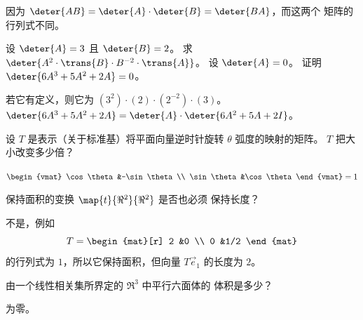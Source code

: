 \begin{exercises}
   \begin{answer}  %
     因为 $\deter{AB}=\deter{A}\cdot\deter{B}=\deter{BA}$，而这两个
     矩阵的行列式不同。
   \end{answer}
  \item 
   \begin{exparts}
     \partsitem 设 \( \deter{A}=3 \) 且 \( \deter{B}=2 \)。
        求 \( \deter{A^2\cdot \trans{B}\cdot B^{-2}\cdot \trans{A} } \)。
     \partsitem 设 \( \deter{A}=0 \)。
        证明 \( \deter{6A^3+5A^2+2A}=0 \)。
    \end{exparts}
    \begin{answer}
      \begin{exparts}
        \partsitem 若它有定义，则它为
           \( (3^2)\cdot (2)\cdot (2^{-2})\cdot (3) \)。
        \partsitem \( \deter{6A^3+5A^2+2A}=\deter{A}\cdot\deter{6A^2+5A+2I} \)。
      \end{exparts}  
    \end{answer}
  \recommended \item
    设 \( T \) 是表示（关于标准基）将平面向量逆时针旋转
    \( \theta \) 弧度的映射的矩阵。
    \( T \) 把大小改变多少倍？
    \begin{answer}
       \(\begin{vmat}
                \cos\theta  &-\sin\theta  \\
                \sin\theta  &\cos\theta
              \end{vmat}=1 \)  
    \end{answer}
  \recommended \item
    保持面积的变换 \( \map{t}{\Re^2}{\Re^2} \) 是否也必须
    保持长度？
    \begin{answer}
      不是，例如
      \begin{equation*}
        T=\begin{mat}[r]
          2  &0  \\
          0  &1/2
        \end{mat}
      \end{equation*}
      的行列式为 \( 1 \)，所以它保持面积，但向量 \( T\vec{e}_1 \)
      的长度为 \( 2 \)。  
    \end{answer}
  \item
    由一个线性相关集所界定的 \( \Re^3 \) 中平行六面体的
    体积是多少？
    \begin{answer}
       为零。  
    \end{answer}
  \recommended \item

\end{exercises}
